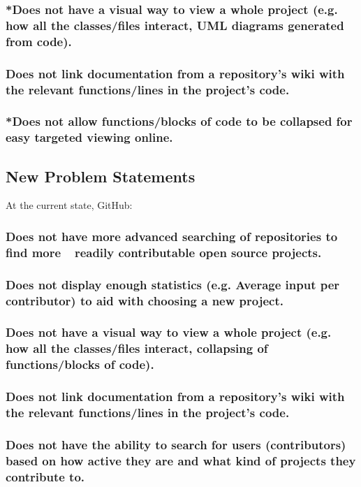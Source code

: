 \documentclass[12pt]{article}
\begin{document}
\subsubsection{*\textnormal{Does not  have a visual way to view a whole project (e.g. how all the classes/files interact, UML diagrams generated from code).} }
\subsubsection{\textnormal{Does not link documentation from a repository's wiki with the relevant functions/lines in the project's code.} }
\subsubsection{*\textnormal{Does not allow functions/blocks of code to be collapsed for easy targeted viewing online.}}

\subsection{New Problem Statements}
At the current state, \textsf{GitHub}:
\subsubsection{\textnormal{Does not have more advanced searching of repositories to find more $~~$ readily contributable open source projects.}}
\subsubsection{\textnormal{Does not display enough statistics (e.g. Average input per contributor) to aid with choosing a new project.}}
\subsubsection{Does not  have a visual way to view a whole project (e.g. how all the classes/files interact, collapsing of functions/blocks of code).} 
\subsubsection{\textnormal{Does not link documentation from a repository's wiki with the relevant functions/lines in the project's code.}}
\subsubsection{Does not have the ability to search for users (contributors) based on how active they are and what kind of projects they contribute to.}
\end{document}
